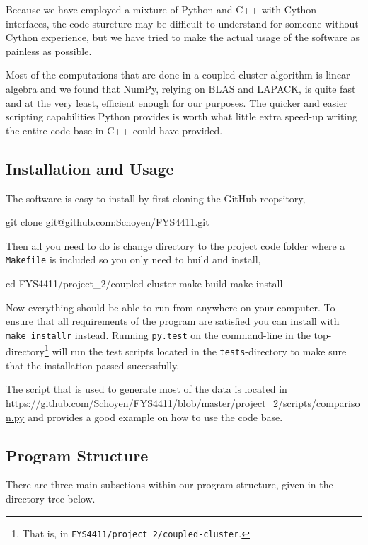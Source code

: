 \documentclass[
    a4paper, aps, twocolumn, floatfix, superscriptaddress,
    nofootinbib]{revtex4-1}
\newcommand{\1}{\mathds{1}}
\begin{document}
    Because we have employed a mixture of Python and C++ with Cython interfaces,
    the code sturcture may be difficult to understand for someone without Cython
    experience, but we have tried to make the actual usage of the software as
    painless as possible.

    Most of the computations that are done in a coupled cluster algorithm is
    linear algebra and we found that NumPy, relying on BLAS and LAPACK, is quite
    fast and at the very least, efficient enough for our purposes. The quicker
    and easier scripting capabilities Python provides is worth what little extra
    speed-up writing the entire code base in C++ could have provided.

    \subsection{Installation and Usage}

        The software is easy to install by first cloning the GitHub reopsitory,
        \begin{bash}
            git clone git@github.com:Schoyen/FYS4411.git
        \end{bash}
        Then all you need to do is change directory to the project code folder
        where a \lstinline{Makefile} is included so you only need to build and
        install,
        \begin{bash}
            cd FYS4411/project_2/coupled-cluster
            make build
            make install
        \end{bash}
        Now everything should be able to run from anywhere on your computer.  To
        ensure that all requirements of the program are satisfied you can
        install with \texttt{make installr} instead. Running
        \texttt{py.test} on the command-line in the
        top-directory\footnote{That is, in
        \texttt{FYS4411/project\_2/coupled-cluster}.} will run the test scripts
        located in the \texttt{tests}-directory to make sure that the
        installation passed successfully.

        The script that is used to generate most of the data is located in
        \url{https://github.com/Schoyen/FYS4411/blob/master/project_2/scripts/comparison.py}
        and provides a good example on how to use the code base.

    \subsection{Program Structure}
        There are three main subsetions within our program structure,
        given in the directory tree below.
\end{document}
